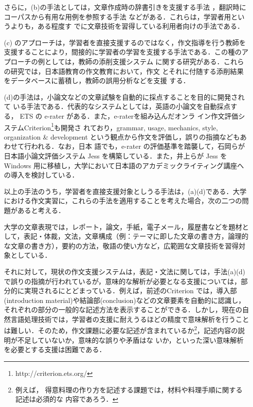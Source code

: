 \documentclass[japanese]{jnlp_1.4}
\newcommand{\subsubsectionX}[1]{}
\begin{document}
{さらに，(b)の手法としては，文章作成時の辞書引きを支援する手法
\cite{takabayashi2004}，翻訳時にコーパスから有用な用例を参照する手法
\cite{sharoff2006}などがある．これらは，学習者用というよりも，ある程度す
でに文章技術を習得している利用者向けの手法である．

(c) のアプローチは，学習者を直接支援するのではなく，作文指導を行う教師を
支援することにより，間接的に学習者の学習を支援する手法である．この種のア
プローチの例としては，教師の添削支援システム\cite{usami2007,sunaoka2006} 
に関する研究がある．これらの研究では，日本語教育の作文教育において，作文
とそれに付随する添削結果をデータベースに蓄積し，教師の誤用分析などを支援
する．

(d)の手法は，小論文などの文章試験を自動的に採点することを目的に開発されて
いる手法である．代表的なシステムとしては，英語の小論文を自動採点する，
ETS の e-rater \cite{burstein1998} がある．また，e-raterを組み込んだオンラ
イン作文評価システムCriterion\footnote{http://criterion.ets.org/}も開発さ
れており，grammar, usage, mechanics, style, organization \& development
という観点から作文を評価し，誤りの指摘などもあわせて行われる．なお，日本
語でも，e-rater の評価基準を踏襲して，石岡らが日本語小論文評価システム
Jess \cite{ishioka-kameda:2006:COLACL}を構築している．また，井上らが Jess
を Windows 用に移植し，大学において日本語のアカデミックライティング講座へ
の導入を検討している\cite{井上達紀:20050824}．

以上の手法のうち，学習者を直接支援対象としうる手法は，(a)(d)である．大学
における作文実習に，これらの手法を適用することを考えた場合，次の二つの問
題があると考える．


\subsubsectionX{問題点1: 意味処理が必要となる支援が困難なこと}
大学の文章表現では，レポート，論文，手紙，電子メール，履歴書などを題材と
して，表記・体裁，文法，文章構成（例：テーマに即した文章の書き方，論理的
な文章の書き方），要約の方法，敬語の使い方など，広範囲な文章技術を習得対
象としている\cite{shoji2007,okimori2007}．

それに対して，現状の作文支援システムは，表記・文法に関しては，手法(a)(d)
で誤りの指摘が行われているが，意味的な解析が必要となる支援については，部
分的に実現されるにとどまっている．例えば，前述のCriterion では，導入部
(introduction material)や結論部(conclusion)などの文章要素を自動的に認識し，
それぞれの部分の一般的な記述方法を表示することができる．しかし，現在の自
然言語処理技術では，学習者の支援に耐えうるほどの精度で意味解析を行うこと
は難しい．そのため，作文課題に必要な記述が含まれているか\footnote{例えば，
得意料理の作り方を記述する課題では，材料や料理手順に関する記述は必須的な
内容であろう．}，記述内容の説明が不足していないか，意味的な誤りや矛盾はな
いか，といった深い意味解析を必要とする支援は困難である．


}
\end{document}
